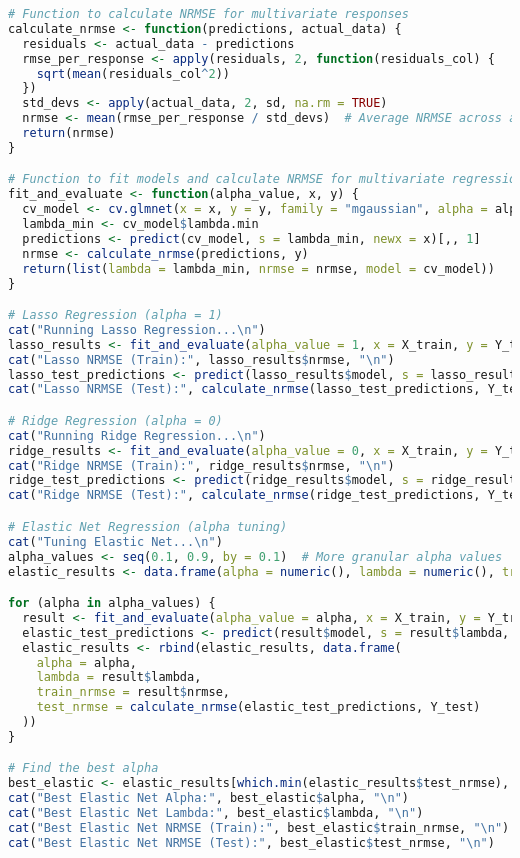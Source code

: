 \begin{lstlisting}[language=R, breaklines=true, basicstyle=\ttfamily\small, columns=fullflexible]
# Function to calculate NRMSE for multivariate responses
calculate_nrmse <- function(predictions, actual_data) {
  residuals <- actual_data - predictions
  rmse_per_response <- apply(residuals, 2, function(residuals_col) {
    sqrt(mean(residuals_col^2))
  })
  std_devs <- apply(actual_data, 2, sd, na.rm = TRUE)
  nrmse <- mean(rmse_per_response / std_devs)  # Average NRMSE across all responses
  return(nrmse)
}

# Function to fit models and calculate NRMSE for multivariate regression
fit_and_evaluate <- function(alpha_value, x, y) {
  cv_model <- cv.glmnet(x = x, y = y, family = "mgaussian", alpha = alpha_value)
  lambda_min <- cv_model$lambda.min
  predictions <- predict(cv_model, s = lambda_min, newx = x)[,, 1]
  nrmse <- calculate_nrmse(predictions, y)
  return(list(lambda = lambda_min, nrmse = nrmse, model = cv_model))
}

# Lasso Regression (alpha = 1)
cat("Running Lasso Regression...\n")
lasso_results <- fit_and_evaluate(alpha_value = 1, x = X_train, y = Y_train)
cat("Lasso NRMSE (Train):", lasso_results$nrmse, "\n")
lasso_test_predictions <- predict(lasso_results$model, s = lasso_results$lambda, newx = X_test)[,, 1]
cat("Lasso NRMSE (Test):", calculate_nrmse(lasso_test_predictions, Y_test), "\n")

# Ridge Regression (alpha = 0)
cat("Running Ridge Regression...\n")
ridge_results <- fit_and_evaluate(alpha_value = 0, x = X_train, y = Y_train)
cat("Ridge NRMSE (Train):", ridge_results$nrmse, "\n")
ridge_test_predictions <- predict(ridge_results$model, s = ridge_results$lambda, newx = X_test)[,, 1]
cat("Ridge NRMSE (Test):", calculate_nrmse(ridge_test_predictions, Y_test), "\n")

# Elastic Net Regression (alpha tuning)
cat("Tuning Elastic Net...\n")
alpha_values <- seq(0.1, 0.9, by = 0.1)  # More granular alpha values
elastic_results <- data.frame(alpha = numeric(), lambda = numeric(), train_nrmse = numeric(), test_nrmse = numeric())

for (alpha in alpha_values) {
  result <- fit_and_evaluate(alpha_value = alpha, x = X_train, y = Y_train)
  elastic_test_predictions <- predict(result$model, s = result$lambda, newx = X_test)[,, 1]
  elastic_results <- rbind(elastic_results, data.frame(
    alpha = alpha,
    lambda = result$lambda,
    train_nrmse = result$nrmse,
    test_nrmse = calculate_nrmse(elastic_test_predictions, Y_test)
  ))
}

# Find the best alpha
best_elastic <- elastic_results[which.min(elastic_results$test_nrmse), ]
cat("Best Elastic Net Alpha:", best_elastic$alpha, "\n")
cat("Best Elastic Net Lambda:", best_elastic$lambda, "\n")
cat("Best Elastic Net NRMSE (Train):", best_elastic$train_nrmse, "\n")
cat("Best Elastic Net NRMSE (Test):", best_elastic$test_nrmse, "\n")


\end{lstlisting}
